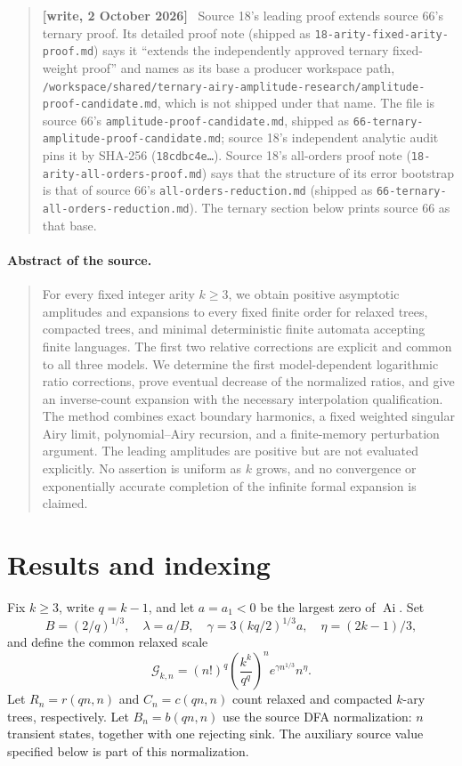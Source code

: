 \documentclass[11pt,letterpaper]{article}
\numberwithin{equation}{section}
\theoremstyle{remark}
\newcommand{\Ai}{\operatorname{Ai}}
\newcommand{\G}{\mathcal G}
\newenvironment{writenote}{\par\smallskip\begin{quote}\small\textbf{[write, 2 October 2026]}\ }{\end{quote}\smallskip}
\newcommand{\repopath}[1]{\nolinkurl{#1}}
\begin{document}
\begin{writenote}
Source 18's leading proof extends source 66's ternary proof. Its detailed proof note (shipped as \repopath{18-arity-fixed-arity-proof.md}) says it ``extends the independently approved ternary fixed-weight proof'' and names as its base a producer workspace path, \repopath{/workspace/shared/ternary-airy-amplitude-research/amplitude-proof-candidate.md}, which is not shipped under that name. The file is source 66's \repopath{amplitude-proof-candidate.md}, shipped as \repopath{66-ternary-amplitude-proof-candidate.md}; source 18's independent analytic audit pins it by SHA-256 (\texttt{18cdbc4e\ldots}). Source 18's all-orders proof note (\repopath{18-arity-all-orders-proof.md}) says that the structure of its error bootstrap is that of source 66's \repopath{all-orders-reduction.md} (shipped as \repopath{66-ternary-all-orders-reduction.md}). The ternary section below prints source 66 as that base.
\end{writenote}

\paragraph{Abstract of the source.}
\begin{quote}\small
For every fixed integer arity $k\ge3$, we obtain positive asymptotic amplitudes and expansions to every fixed finite order for relaxed trees, compacted trees, and minimal deterministic finite automata accepting finite languages. The first two relative corrections are explicit and common to all three models. We determine the first model-dependent logarithmic ratio corrections, prove eventual decrease of the normalized ratios, and give an inverse-count expansion with the necessary interpolation qualification. The method combines exact boundary harmonics, a fixed weighted singular Airy limit, polynomial--Airy recursion, and a finite-memory perturbation argument. The leading amplitudes are positive but are not evaluated explicitly. No assertion is uniform as $k$ grows, and no convergence or exponentially accurate completion of the infinite formal expansion is claimed.
\end{quote}


\section{Results and indexing}\label{air:ka:sec:results}
Fix $k\ge3$, write $q=k-1$, and let $a=a_1<0$ be the largest zero of $\Ai$. Set
\begin{equation}\label{air:ka:eq:constants}
 B=(2/q)^{1/3},\quad \lambda=a/B,\quad
 \gamma=3(kq/2)^{1/3}a,\quad \eta=(2k-1)/3,
\end{equation}
and define the common relaxed scale
\begin{equation}\label{air:ka:eq:scale}
 \G_{k,n}=(n!)^q\left(\frac{k^k}{q^q}\right)^n
 e^{\gamma n^{1/3}}n^\eta.
\end{equation}
Let $R_n=r(qn,n)$ and $C_n=c(qn,n)$ count relaxed and compacted $k$-ary trees, respectively. Let $B_n=b(qn,n)$ use the source DFA normalization: $n$ transient states, together with one rejecting sink. The auxiliary source value specified below is part of this normalization.
\end{document}
